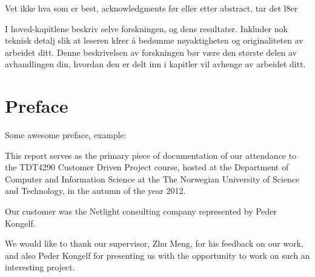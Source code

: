 \documentclass[10pt,a4paper,oneside]{report}
\begin{document}
Vet ikke hva som er best, acknowledgments før eller etter abstract, tar det l8er

I hoved-kapitlene beskriv selve forskningen,
og dens resultater. Inkluder nok teknisk
detalj slik at leseren klrer å bedømme
nøyaktigheten og originaliteten av arbeidet
ditt.
Denne beskrivelsen av forskningen bør være
den største delen av avhandlingen din,
hvordan den er delt inn i kapitler vil avhenge
av arbeidet ditt.


\chapter*{Preface}
Some awesome preface, example:

This report serves as the primary piece of documentation of our attendance to the TDT4290 Customer Driven Project course, hosted at the Department of Computer and Information Science at the The Norwegian University of Science and Technology, in the autumn of the year 2012.

Our customer was the Netlight consulting company represented by Peder Kongelf.

We would like to thank our supervisor, Zhu Meng, for his feedback on our work, and also Peder Kongelf for presenting us with the opportunity to work on such an interesting project.

\setcounter{tocdepth}{1}
\dominitoc
\dominilof
\dominilot
\tableofcontents
\clearpage
\listoffigures
\listoftables













\end{document}
